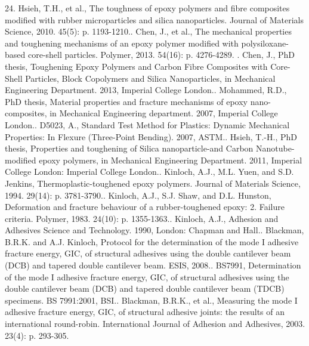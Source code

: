 \documentclass[numbers=noendperiod,chapterprefix=on]{icldt} %
\begin{document}
24.	Hsieh, T.H., et al., The toughness of epoxy polymers and fibre composites modified with rubber microparticles and silica nanoparticles. Journal of Materials Science, 2010. 45(5): p. 1193-1210..	Chen, J., et al., The mechanical properties and toughening mechanisms of an epoxy polymer modified with polysiloxane-based core-shell particles. Polymer, 2013. 54(16): p. 4276-4289.
.	Chen, J., PhD thesis, Toughening Epoxy Polymers and Carbon Fibre Composites with Core-Shell Particles, Block Copolymers and Silica Nanoparticles, in Mechanical Engineering Department. 2013, Imperial College London..	Mohammed, R.D., PhD thesis, Material properties and fracture mechanisms of epoxy nano-composites, in Mechanical Engineering department. 2007, Imperial College London..	D5023, A., Standard Test Method for Plastics: Dynamic Mechanical Properties: In Flexure (Three-Point Bending). 2007, ASTM..	Hsieh, T.-H., PhD thesis, Properties and toughening of Silica nanoparticle-and Carbon Nanotube-modified epoxy polymers, in Mechanical Engineering Department. 2011, Imperial College London: Imperial College London..	Kinloch, A.J., M.L. Yuen, and S.D. Jenkins, Thermoplastic-toughened epoxy polymers. Journal of Materials Science, 1994. 29(14): p. 3781-3790..	Kinloch, A.J., S.J. Shaw, and D.L. Hunston, Deformation and fracture behaviour of a rubber-toughened epoxy: 2. Failure criteria. Polymer, 1983. 24(10): p. 1355-1363..	Kinloch, A.J., Adhesion and Adhesives Science and Technology. 1990, London: Chapman and Hall..	Blackman, B.R.K. and A.J. Kinloch, Protocol for the determination of the mode I adhesive fracture energy, GIC, of structural adhesives using the double cantilever beam (DCB) and tapered double cantilever beam. ESIS, 2008..	BS7991, Determination of the mode I adhesive fracture energy, GIC, of structural adhesives using the double cantilever beam (DCB) and tapered double cantilever beam (TDCB) specimens. BS 7991:2001, BSI..	Blackman, B.R.K., et al., Measuring the mode I adhesive fracture energy, GIC, of structural adhesive joints: the results of an international round-robin. International Journal of Adhesion and Adhesives, 2003. 23(4): p. 293-305.\newline
\end{document}
